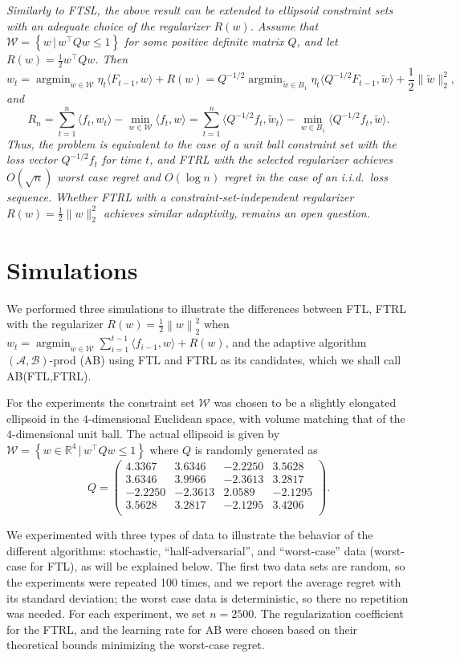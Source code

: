 \documentclass[english]{article}
\newcommand{\cA}{\mathcal{A}}
\newcommand{\cB}{\mathcal{B}}
\newcommand{\cW}{\mathcal{W}}
\newcommand{\seto}[1]{\left\{#1\right\}}
\newcommand{\R}{\mathbb{R}}
\newcommand{\inpro}[2]{\langle #1, #2\rangle}
\newcommand{\ip}[1]{\langle#1\rangle}
\newcommand{\set}[2]{\left\{#1 \,\vert\, #2 \right\}}
\newcommand{\norm}[1]{\left\| #1 \right\|}
\DeclareMathOperator*{\argmin}{argmin}
\begin{document}
\begin{remark}\em
Similarly to FTSL,  the above result can be extended to ellipsoid constraint sets with an adequate choice of the regularizer $R(w)$.
Assume that $\cW = \seto{ w \,\vert\, w^{\top}Qw \le 1}$ for some positive definite matrix $Q$, and let $R(w) = \frac{1}{2} w^{\top}Qw$. Then
\[
	w_{t} = \argmin_{w\in \cW} \eta_t \inpro{F_{t-1}}{w} + R(w) = Q^{-1/2} \argmin_{\tilde{w}\in B_1} \eta_t \inpro{Q^{-1/2}F_{t-1}}{\tilde{w}} + \frac{1}{2}\|\tilde{w}\|_2^2, 
\]
and 
\[
R_n = \sum_{t=1}^{n} \inpro{f_t}{w_t} - \min_{w\in\cW}  \inpro{f_t}{w} = \sum_{t=1}^{n} \inpro{Q^{-1/2}f_t}{\tilde{w}_t} - \min_{w\in B_1}  \inpro{Q^{-1/2}f_t}{\tilde{w}}.
\]
Thus, the problem is equivalent to the case of a unit ball constraint set with the loss vector $Q^{-1/2}f_t$ for time $t$, and FTRL with the selected regularizer achieves $O(\sqrt{n})$ worst case regret and $O(\log n)$ regret in the case of an i.i.d.\ loss sequence. Whether FTRL with a constraint-set-independent regularizer $R(w) = \frac{1}{2}\|w\|_2^2$ achieves similar adaptivity, remains an open question.
\end{remark}

\section{Simulations}
\label{sec:Simulations}
We performed three simulations to illustrate the differences between  FTL, FTRL with the regularizer $R(w) = \frac12 \norm{w}_2^2$ when
$w_t = \argmin_{w\in \cW} \sum_{i=1}^{t-1} \ip{f_{i-1},w} + R(w)$,
and the adaptive algorithm $(\cA,\cB)$-prod (AB) using FTL and FTRL as its candidates, which we shall call AB(FTL,FTRL).

For the experiments the constraint set $\cW$ was chosen to be a slightly elongated ellipsoid in the $4$-dimensional Euclidean space, with volume matching that of the $4$-dimensional unit ball.
The actual ellipsoid is given by 
$\cW = \set{w\in \R^4}{w^{\top}Qw \le 1}$
where $Q$ is randomly generated as
\[
Q  = \left(\begin{array}{cccc}
4.3367    & 3.6346   & -2.2250   & 3.5628 \\
3.6346    & 3.9966   & -2.3613   & 3.2817\\
-2.2250   & -2.3613  &  2.0589  & -2.1295\\
3.5628    & 3.2817  & -2.1295  &  3.4206\\
\end{array}\right).
\]

We experimented with three types of data to illustrate the behavior of the different algorithms: stochastic, ``half-adversarial'', and ``worst-case'' data (worst-case for FTL), as will be explained below.
The first two data sets are random, so the experiments were repeated 100 times, and we report the average regret with its standard deviation; the worst case data is deterministic, so there no repetition was needed.
For each experiment, we set $n = 2500$. 
The regularization coefficient for the FTRL, and the learning rate for AB were chosen based on their theoretical bounds
minimizing the worst-case regret.
\end{document}
